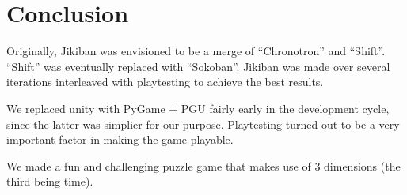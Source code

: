 \section{Conclusion} 
Originally, Jikiban was envisioned to be a merge of ``Chronotron'' and
``Shift''.  ``Shift'' was eventually replaced with ``Sokoban''.
Jikiban was made over several iterations interleaved with playtesting
to achieve the best results.

We replaced unity with PyGame + PGU fairly early in the development
cycle, since the latter was simplier for our purpose.  Playtesting
turned out to be a very important factor in making the game playable.

We made a fun and challenging puzzle game that makes use of 3
dimensions (the third being time).



